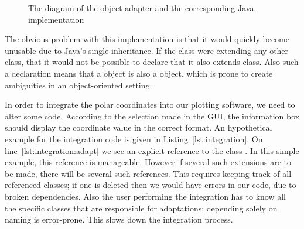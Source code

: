\begin{figure}
\centering
{}
\hspace{20pt}
\vfill
{}
\caption{The diagram of the object adapter and the corresponding Java implementation}
\end{figure}

The obvious problem with this implementation is that it would quickly become unusable due to Java's single inheritance. 
If the  class were extending any other class, that it would not be possible to declare that it also extends  class. 
Also such a declaration means that a  object is also a  object, which is prone to create ambiguities in an object-oriented setting. 

In order to integrate the polar coordinates into our plotting software, we need to alter some code. 
According to the selection made in the GUI, the information box should display the coordinate value in the correct format. 
An hypothetical example for the integration code is given in Listing~\ref{lst:integration}.
On line~\ref{lst:integration:adapt} we see an explicit reference to the class .
In this simple example, this reference is manageable. 
However if several such extensions are to be made, there will be several such references.
This requires keeping track of all referenced classes; if one is deleted then we would have errors in our code, due to broken dependencies. 
Also the user performing the integration has to know all the specific classes that are responsible for adaptations; depending solely on naming is error-prone. 
This slows down the integration process.

